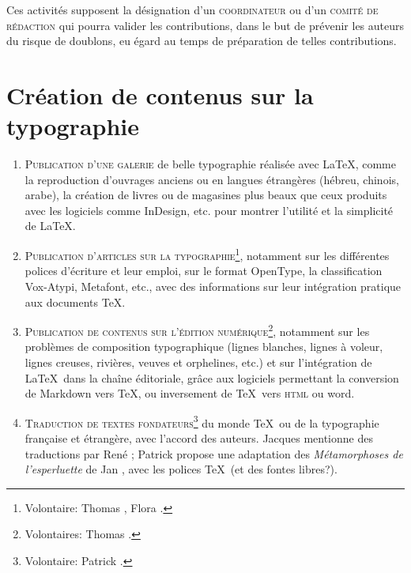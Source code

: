 \documentclass{tufte-handout}
\newcommand{\ratio}[3][]{\marginpar{\footnotesize{\textcolor{teal}{Temps requis: #2 / Utilité: #3}\par\noindent \textcolor{teal}{#1}}}}
\begin{document}
Ces activités supposent la désignation d'un \textsc{coordinateur}\ratio[Potentiellement chronophage]{++}{++} ou d'un \textsc{comité de rédaction} qui pourra valider les contributions, dans le but de prévenir les auteurs du risque de doublons, eu égard au temps de préparation de telles contributions.


\section{Création de contenus sur la typographie}

\begin{enumerate}
	\item\textsc{Publication d'une galerie}\ratio[Les documents existent]{+}{+++} de belle typographie réalisée avec \LaTeX, comme la reproduction d'ouvrages anciens ou en langues étrangères (hébreu, chinois, arabe), la création de livres ou de magasines plus beaux que ceux produits avec les logiciels comme InDesign, etc. pour montrer l'utilité et la simplicité de \LaTeX.
	\item\textsc{Publication d'articles sur la typographie}\ratio[Individuellement assez peu chronophage, d'autant que certaines ressources existent]{++}{++}\footnote{Volontaire: Thomas , Flora .}, notamment sur les différentes polices d'écriture et leur emploi, sur le format OpenType, la classification Vox-Atypi, Metafont, etc., avec des informations sur leur intégration pratique aux documents \TeX.
	\item\textsc{Publication de contenus sur l'édition numérique}\ratio[Individuellement assez peu chronophage, d'autant que certaines ressources existent]{++}{++}\footnote{Volontaires: Thomas .}, notamment sur les problèmes de composition typographique (lignes blanches, lignes à voleur, lignes creuses, rivières, veuves et orphelines, etc.) et sur l'intégration de \LaTeX\ dans la chaîne éditoriale, grâce aux logiciels permettant la conversion de Markdown vers \TeX, ou inversement de \TeX\ vers \textsc{html} ou word.
	\item\textsc{Traduction de textes fondateurs}\ratio[Chronophage]{+++}{+}\footnote{Volontaire: Patrick .} du monde \TeX\ ou de la typographie française et étrangère, avec l'accord des auteurs. Jacques  mentionne des traductions par René ; Patrick  propose une adaptation des \emph{Métamorphoses de l'esperluette} de Jan , avec les polices \TeX~(et des fontes libres?).
\end{enumerate}
\end{document}

